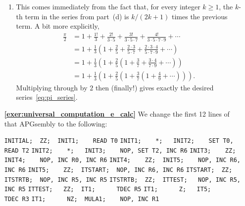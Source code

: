 \begin{multicols}{2}
\begin{itemize}[leftmargin=0em]
\begin{enumerate}[leftmargin=1.5em,label=\bf\color{ocre}(\alph*)]
			\item This comes immediately from the fact that, for every integer $k \geq 1$, the $k$-th term in the series from part~(d) is $k/(2k+1)$ times the previous term. A bit more explicitly,
			\begin{align*}
				\frac{\pi}{2} & = 1 + \frac{1!}{3} + \frac{2!}{3\cdot 5} + \frac{3!}{3\cdot 5 \cdot 7} + \frac{4!}{3 \cdot 5 \cdot 7 \cdot 9} + \cdots \\
				& = 1 + \frac{1}{3}\left(1 + \frac{2}{5} + \frac{2\cdot 3}{5 \cdot 7} + \frac{2\cdot 3\cdot 4}{5 \cdot 7 \cdot 9} + \cdots\right) \\
				& = 1 + \frac{1}{3}\left(1 + \frac{2}{5}\left(1 + \frac{3}{7} + \frac{3\cdot 4}{7 \cdot 9} + \cdots\right)\right) \\
				& = 1 + \frac{1}{3}\left(1 + \frac{2}{5}\left(1 + \frac{3}{7}\left(1 + \frac{4}{9} + \cdots\right)\right)\right).
			\end{align*}
			Multiplying through by $2$ then (finally!) gives exactly the desired series~\eqref{eq:pi_series}.\\
		\end{enumerate}
		
		\item[\bf\color{ocre}\sffamily\ref{exer:universal_computation_e_calc}] We change the first 12 lines of that APGsembly to the following:
		\begin{center}
			\noindent\begin{minipage}{\linewidth}
				\noindent\verb|INITIAL;  ZZ;  INIT1;    READ T0|
				\verb|INIT1;    *;   INIT2;    SET T0, READ T2|
				\verb|INIT2;    *;   INIT3;    NOP, SET T2, INC R6|
				\verb|INIT3;    ZZ;  INIT4;    NOP, INC R0, INC R6|
				\verb|INIT4;    ZZ;  INIT5;    NOP, INC R6, INC R6|
				\verb|INIT5;    ZZ;  ITSTART;  NOP, INC R6, INC R6|
				\verb|ITSTART;  ZZ;  ITSTRTB;  NOP, INC R5, INC R5|
				\verb|ITSTRTB;  ZZ;  ITTEST;   NOP, INC R5, INC R5|
				\verb|ITTEST;   ZZ;  IT1;      TDEC R5|
				\verb|IT1;      Z;   IT5;      TDEC R3|
				\verb|IT1;      NZ;  MULA1;    NOP, INC R1|
			\end{minipage}
		\end{center}
	\end{itemize}
\end{multicols}



\hypertarget{solutions_self_support_spaceships}{}\label{solutions_self_support_spaceships}

